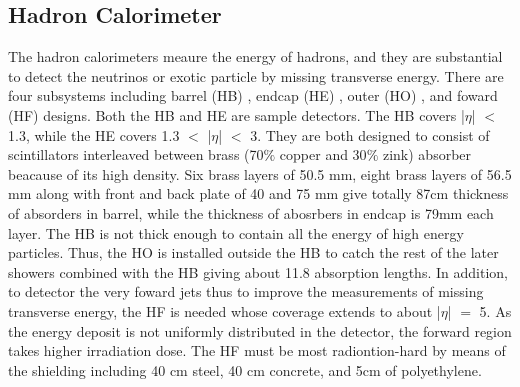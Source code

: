 \subsection{Hadron Calorimeter} 
The hadron calorimeters meaure the energy of hadrons, and they are substantial to detect the neutrinos or exotic particle by missing transverse energy.
There are four subsystems including barrel (HB) , endcap (HE) , outer (HO) , and foward (HF) designs.
Both the HB and HE are sample detectors. 
The HB covers |$\eta $| $<$ 1.3, while the HE covers 1.3 $<$ |$\eta $| $<$ 3.
They are both designed to consist of scintillators interleaved between brass (70$\% $ copper and 30$\% $ zink) absorber beacause of its high density.
Six brass layers of 50.5 mm, eight brass layers of 56.5 mm along with front and back plate of 40 and 75 mm give totally 87cm thickness of absorders in barrel, while the thickness of abosrbers in endcap is 79mm each layer.
The HB is not thick enough to contain all the energy of high energy particles.
Thus, the HO is installed outside the HB to catch the rest of the later showers combined with the HB giving about 11.8 absorption lengths.
In addition, to detector the very foward jets thus to improve the measurements of missing transverse energy, the HF is needed whose coverage extends to about |$\eta $| $=$ 5.
As the energy deposit is not uniformly distributed in the detector, the forward region takes higher irradiation dose.
The HF must be most radiontion-hard by means of the shielding including 40 cm steel, 40 cm concrete, and 5cm of polyethylene.  



